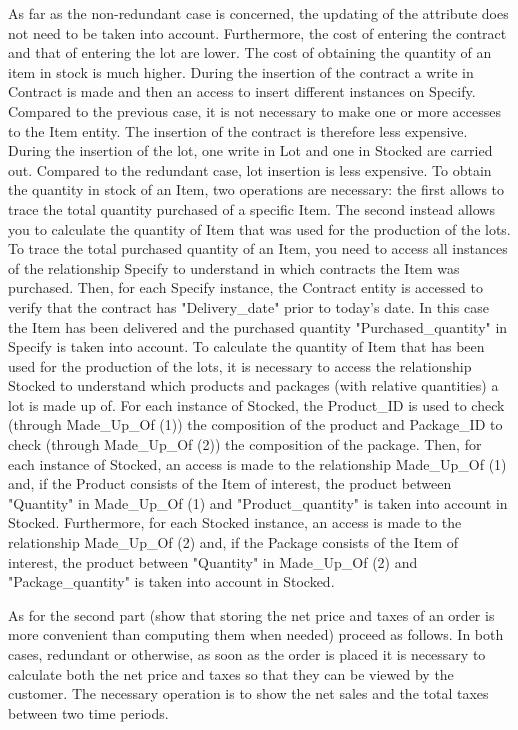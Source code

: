 As far as the non-redundant case is concerned, the updating of the attribute does not need to be taken into account. Furthermore, the cost of entering the contract and that of entering the lot are lower. The cost of obtaining the quantity of an item in stock is much higher.
During the insertion of the contract a write in Contract is made and then an access to insert different instances on Specify. Compared to the previous case, it is not necessary to make one or more accesses to the Item entity. The insertion of the contract is therefore less expensive.
During the insertion of the lot, one write in Lot and one in Stocked are carried out. Compared to the redundant case, lot insertion is less expensive.
To obtain the quantity in stock of an Item, two operations are necessary: ​​the first allows to trace the total quantity purchased of a specific Item. The second instead allows you to calculate the quantity of Item that was used for the production of the lots.
To trace the total purchased quantity of an Item, you need to access all instances of the relationship Specify to understand in which contracts the Item was purchased. Then, for each Specify instance, the Contract entity is accessed to verify that the contract has "Delivery_date" prior to today's date. In this case the Item has been delivered and the purchased quantity "Purchased_quantity" in Specify is taken into account.
To calculate the quantity of Item that has been used for the production of the lots, it is necessary to access the relationship Stocked to understand which products and packages (with relative quantities) a lot is made up of. For each instance of Stocked, the Product_ID is used to check (through Made_Up_Of (1)) the composition of the product and Package_ID to check (through Made_Up_Of (2)) the composition of the package. Then, for each instance of Stocked, an access is made to the relationship Made_Up_Of (1) and, if the Product consists of the Item of interest, the product between "Quantity" in Made_Up_Of (1) and "Product_quantity" is taken into account in Stocked. Furthermore, for each Stocked instance, an access is made to the relationship Made_Up_Of (2) and, if the Package consists of the Item of interest, the product between "Quantity" in Made_Up_Of (2) and "Package_quantity" is taken into account in Stocked.



As for the second part (show that storing the net price and taxes of an order is more convenient than computing them when needed) proceed as follows.
In both cases, redundant or otherwise, as soon as the order is placed it is necessary to calculate both the net price and taxes so that they can be viewed by the customer.
The necessary operation is to show the net sales and the total taxes between two time periods.

